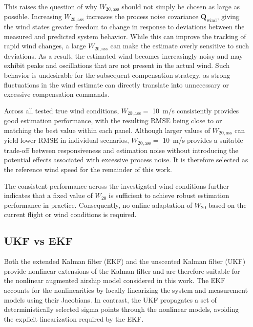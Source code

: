 This raises the question of why $W_{20,\mathrm{ass}}$ should not simply be chosen as large as possible. Increasing $W_{20,\mathrm{ass}}$ increases the process noise covariance $\bm{Q}_{\mathrm{wind}}$, giving the wind states greater freedom to change in response to deviations between the measured and predicted system behavior. While this can improve the tracking of rapid wind changes, a large $W_{20,\mathrm{ass}}$ can make the estimate overly sensitive to such deviations. As a result, the estimated wind becomes increasingly noisy and may exhibit peaks and oscillations that are not present in the actual wind. Such behavior is undesirable for the subsequent compensation strategy, as strong fluctuations in the wind estimate can directly translate into unnecessary or excessive compensation commands.

Across all tested true wind conditions, $W_{20,\mathrm{ass}}=$ \SI{10}{m/s} consistently provides good estimation performance, with the resulting RMSE being close to or matching the best value within each panel. Although larger values of $W_{20,\mathrm{ass}}$ can yield lower RMSE in individual scenarios, $W_{20,\mathrm{ass}}=$ \SI{10}{m/s} provides a suitable trade-off between responsiveness and estimation noise without introducing the potential effects associated with excessive process noise. It is therefore selected as the reference wind speed for the remainder of this work.

The consistent performance across the investigated wind conditions further indicates that a fixed value of $W_{20}$ is sufficient to achieve robust estimation performance in practice.
Consequently, no online adaptation of $W_{20}$ based on the current flight or wind conditions is required.





\subsection{UKF vs EKF}
\label{sec:5.1.2EKFvsUKF}

Both the extended Kalman filter (EKF) and the unscented Kalman filter (UKF) provide nonlinear extensions of the Kalman filter and are therefore suitable for the nonlinear augmented airship model considered in this work. The EKF accounts for the nonlinearities by locally linearizing the system and measurement models using their Jacobians. In contrast, the UKF propagates a set of deterministically selected sigma points through the nonlinear models, avoiding the explicit linearization required by the EKF. 

